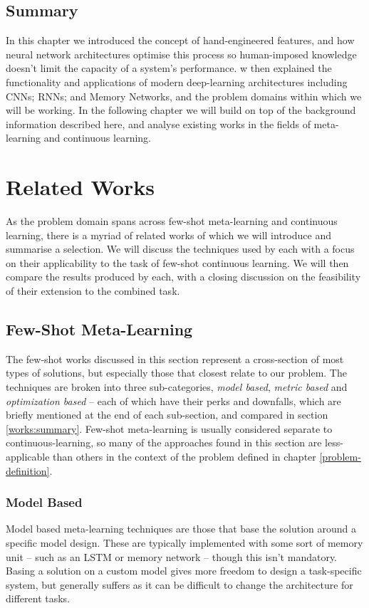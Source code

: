 \documentclass{report}
\begin{document}
\section{Summary}
In this chapter we introduced the concept of hand-engineered features, and how neural network architectures optimise this process so human-imposed knowledge doesn't limit the capacity of a system's performance. w then explained the functionality and applications of modern deep-learning architectures including CNNs; RNNs; and Memory Networks, and the problem domains within which we will be working. In the following chapter we will build on top of the background information described here, and analyse existing works in the fields of meta-learning and continuous learning. \par

\chapter{Related Works} \label{related:1}
As the problem domain spans across few-shot meta-learning and continuous learning, there is a myriad of related works of which we will introduce and summarise a selection. We will discuss the techniques used by each with a focus on their applicability to the task of few-shot continuous learning. We will then compare the results produced by each, with a closing discussion on the feasibility of their extension to the combined task. \par

\section{Few-Shot Meta-Learning}
The few-shot works discussed in this section represent a cross-section of most types of solutions, but especially those that closest relate to our problem. The techniques are broken into three sub-categories, \emph{model based}, \emph{metric based} and \emph{optimization based} -- each of which have their perks and downfalls, which are briefly mentioned at the end of each sub-section, and compared in section \ref{works:summary}. Few-shot meta-learning is usually considered separate to continuous-learning, so many of the approaches found in this section are less-applicable than others in the context of the problem defined in chapter \ref{problem-definition}.

\subsection{Model Based} \label{related-meta-modl:1}
Model based meta-learning techniques are those that base the solution around a specific model design. These are typically implemented with some sort of memory unit -- such as an LSTM or memory network -- though this isn't mandatory. Basing a solution on a custom model gives more freedom to design a task-specific system, but generally suffers as it can be difficult to change the architecture for different tasks. \par
\end{document}
